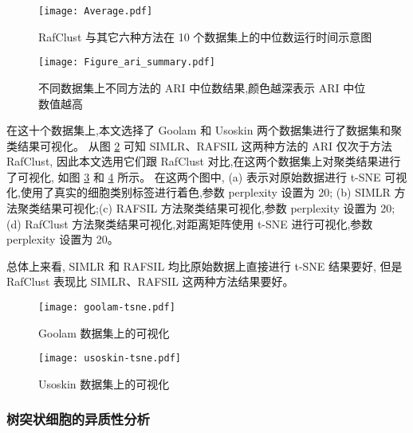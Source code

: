   \begin{figure}[!htbp]
    \centering
    \texttt{[image: Average.pdf]}
    \caption{
    RafClust 与其它六种方法在 10 个数据集上的中位数运行时间示意图
    }
    \label{fig:running-summary}
\end{figure}

\begin{figure}[!htbp]
    \centering
    \texttt{[image: Figure\_ari\_summary.pdf]}
    \caption{
    不同数据集上不同方法的 ARI 中位数结果,颜色越深表示 ARI 中位数值越高
    }
    \label{fig:rafari}
\end{figure}

在这十个数据集上,本文选择了 Goolam 和 Usoskin 两个数据集进行了数据集和聚类结果可视化。
从图 \ref{fig:rafari} 可知 SIMLR、RAFSIL 这两种方法的 ARI 仅次于方法 RafClust,
因此本文选用它们跟 RafClust 对比,在这两个数据集上对聚类结果进行了可视化, 
如图 \ref{fig:goolam-tsne} 和 \ref{fig:usoskin-tsne} 所示。
在这两个图中, (a) 表示对原始数据进行 t-SNE 可视化,使用了真实的细胞类别标签进行着色,参数 perplexity 设置为 20;
(b) SIMLR 方法聚类结果可视化;(c) RAFSIL 方法聚类结果可视化,参数 perplexity 设置为 20;
(d) RafClust 方法聚类结果可视化,对距离矩阵使用 t-SNE 进行可视化,参数 perplexity 设置为 20。

总体上来看, SIMLR 和 RAFSIL 均比原始数据上直接进行 t-SNE 结果要好,
但是 RafClust 表现比 SIMLR、RAFSIL 这两种方法结果要好。

\begin{figure}[!htbp]
  \centering
  \texttt{[image: goolam-tsne.pdf]}
  \caption{
  Goolam 数据集上的可视化
  }
  \label{fig:goolam-tsne}
\end{figure}


\begin{figure}[!htbp]
  \centering
  \texttt{[image: usoskin-tsne.pdf]}
  \caption{
  Usoskin 数据集上的可视化
  }
  \label{fig:usoskin-tsne}
\end{figure}


\subsubsection{树突状细胞的异质性分析}

